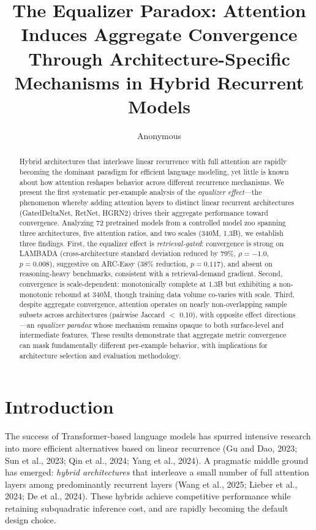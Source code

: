 \documentclass[11pt,a4paper]{article}
\title{The Equalizer Paradox: Attention Induces Aggregate Convergence\\Through Architecture-Specific Mechanisms in Hybrid Recurrent Models}
\author{Anonymous}
\begin{document}
\maketitle

\begin{abstract}
Hybrid architectures that interleave linear recurrence with full attention are rapidly becoming the dominant paradigm for efficient language modeling, yet little is known about how attention reshapes behavior across different recurrence mechanisms. We present the first systematic per-example analysis of the \emph{equalizer effect}---the phenomenon whereby adding attention layers to distinct linear recurrent architectures (GatedDeltaNet, RetNet, HGRN2) drives their aggregate performance toward convergence. Analyzing 72 pretrained models from a controlled model zoo spanning three architectures, five attention ratios, and two scales (340M, 1.3B), we establish three findings. First, the equalizer effect is \emph{retrieval-gated}: convergence is strong on LAMBADA (cross-architecture standard deviation reduced by 79\%, $\rho{=}{-}1.0$, $p{=}0.008$), suggestive on ARC-Easy (38\% reduction, $p{=}0.117$), and absent on reasoning-heavy benchmarks, consistent with a retrieval-demand gradient. Second, convergence is scale-dependent: monotonically complete at 1.3B but exhibiting a non-monotonic rebound at 340M, though training data volume co-varies with scale. Third, despite aggregate convergence, attention operates on nearly non-overlapping sample subsets across architectures (pairwise Jaccard $<$ 0.10), with opposite effect directions---an \emph{equalizer paradox} whose mechanism remains opaque to both surface-level and intermediate features. These results demonstrate that aggregate metric convergence can mask fundamentally different per-example behavior, with implications for architecture selection and evaluation methodology.
\end{abstract}

\section{Introduction}

The success of Transformer-based language models has spurred intensive research into more efficient alternatives based on linear recurrence (Gu and Dao, 2023; Sun et al., 2023; Qin et al., 2024; Yang et al., 2024). A pragmatic middle ground has emerged: \emph{hybrid architectures} that interleave a small number of full attention layers among predominantly recurrent layers (Wang et al., 2025; Lieber et al., 2024; De et al., 2024). These hybrids achieve competitive performance while retaining subquadratic inference cost, and are rapidly becoming the default design choice.
\end{document}
